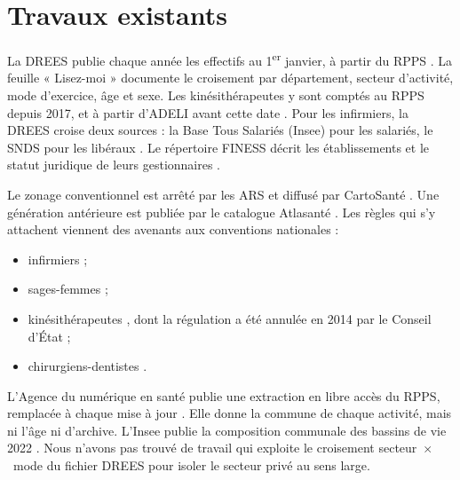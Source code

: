 \documentclass[11pt]{article}
\begin{document}
\section{Travaux existants}
La DREES publie chaque année les effectifs au 1\textsuperscript{er} janvier, à partir du RPPS
\citep{drees2026demo}. La feuille « Lisez-moi » documente le croisement par département, secteur d'activité,
mode d'exercice, âge et sexe. Les kinésithérapeutes y sont comptés au RPPS depuis 2017, et à partir d'ADELI
avant cette date \citep{drees2020er1159}. Pour les infirmiers, la DREES croise deux sources : la Base Tous Salariés
(Insee) pour les salariés, le SNDS pour les libéraux \citep{dreesbts2026}. Le répertoire FINESS décrit les
établissements et le statut juridique de leurs gestionnaires \citep{finessEt2026,finessEj2026}.

Le zonage conventionnel est arrêté par les ARS et diffusé par CartoSanté \citep{cartosante2026}. Une génération
antérieure est publiée par le catalogue Atlasanté \citep{atlasante2014zonage}. Les règles qui s'y attachent
viennent des avenants aux conventions nationales :
\begin{itemize}
  \item infirmiers \citep{ameliIde} ;
  \item sages-femmes \citep{ameliSf} ;
  \item kinésithérapeutes \citep{ameliMk}, dont la régulation a été annulée en 2014 par le Conseil d'État
  \citep{ce2014mk} ;
  \item chirurgiens-dentistes \citep{arspaca2025cd}.
\end{itemize}
L'Agence du numérique en santé publie une extraction en libre accès du RPPS, remplacée à chaque mise à jour \citep{ans2026annuaire}.
Elle donne la commune de chaque activité, mais ni l'âge ni d'archive. L'Insee publie la composition communale
des bassins de vie 2022 \citep{insee2026bv}.
Nous n'avons pas trouvé de travail qui exploite le croisement secteur~$\times$~mode du fichier DREES pour isoler
le secteur privé au sens large.
\end{document}
